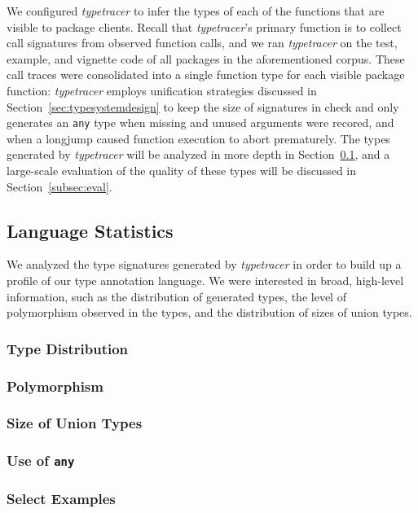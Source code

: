 \documentclass[acmsmall,review,anonymous]{acmart}\settopmatter{printfolios=true,printccs=false,printacmref=false}
\newcommand{\code}[1]{{\lstinline[style=Rin]!#1!}\xspace}
\newcommand{\typetracer}{\emph{typetracer}\xspace} %
\begin{document}
We configured \typetracer to infer the types of each of the functions that are visible to package clients.
Recall that \typetracer's primary function is to collect call signatures from observed function calls, and we ran \typetracer on the test, example, and vignette code of all packages in the aforementioned corpus.
These call traces were consolidated into a single function type for each visible package function:
\typetracer employs unification strategies discussed in Section~\ref{sec:typesystemdesign} to keep the size of signatures in check and only generates an \code{any} type when missing and unused arguments were recored, and when a longjump caused function execution to abort prematurely.
The types generated by \typetracer will be analyzed in more depth in Section~\ref{subsec:stats}, and a large-scale evaluation of the quality of these types will be discussed in Section~\ref{subsec:eval}.

%
%
%
%
\subsection{Language Statistics}
\label{subsec:stats}

We analyzed the type signatures generated by \typetracer in order to build up a profile of our type annotation language.
We were interested in broad, high-level information, such as the distribution of generated types, the level of polymorphism observed in the types, and the distribution of sizes of union types.

%
%
\subsubsection{Type Distribution}

%
%
\subsubsection{Polymorphism}

%
%
\subsubsection{Size of Union Types}

%
%
\subsubsection{Use of \code{any}}

%
%
\subsubsection{Select Examples}
\end{document}
